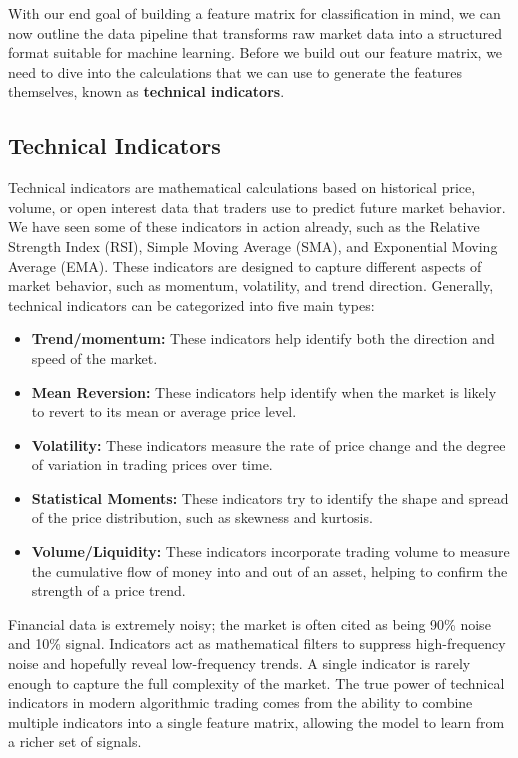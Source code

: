 With our end goal of building a feature matrix for classification in mind, we can now outline the data pipeline that transforms raw market data into a structured format suitable for machine learning. 
Before we build out our feature matrix, we need to dive into the calculations that we can use to generate the features themselves, known as \textbf{technical indicators}.


\subsection{Technical Indicators}

Technical indicators are mathematical calculations based on historical price, volume, or open interest data that traders use to predict future market behavior.
 We have seen some of these indicators in action already, such as the Relative Strength Index (RSI), Simple Moving Average (SMA), and Exponential Moving Average (EMA). 
 These indicators are designed to capture different aspects of market behavior, such as momentum, volatility, and trend direction. Generally, technical indicators can be categorized into five main types:

\begin{itemize}
  \item \textbf{Trend/momentum:} These indicators help identify both the direction and speed of the market.
  \item \textbf{Mean Reversion:} These indicators help identify when the market is likely to revert to its mean or average price level.
  \item \textbf{Volatility:} These indicators measure the rate of price change and the degree of variation in trading prices over time.
  \item \textbf{Statistical Moments:} These indicators try to identify the shape and spread of the price distribution, such as skewness and kurtosis.
  \item \textbf{Volume/Liquidity:} These indicators incorporate trading volume to measure the cumulative flow of money into and out of an asset, helping to confirm the strength of a price trend.
\end{itemize}

Financial data is extremely noisy; the market is often cited as being 90\% noise and 10\% signal.
Indicators act as mathematical filters to suppress high-frequency noise and hopefully reveal low-frequency trends.
A single indicator is rarely enough to capture the full complexity of the market. 
The true power of technical indicators in modern algorithmic trading comes from the ability to combine multiple indicators into a single feature matrix, allowing the model to learn from a richer set of signals.


